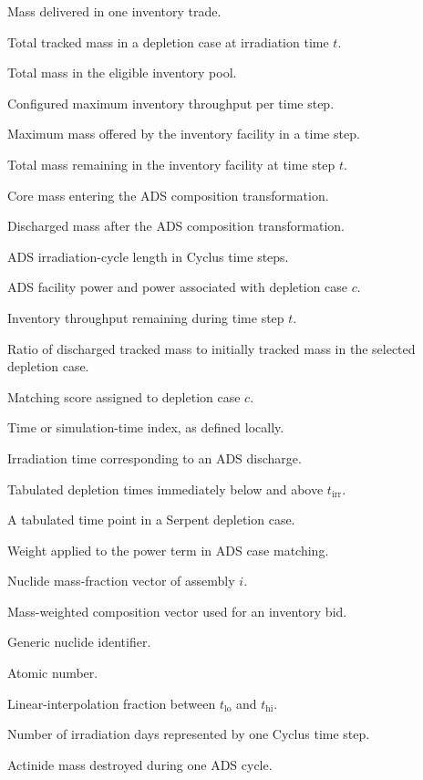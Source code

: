 \begin{symbollist}[1.55in]
\item[\(m_{\mathrm{supplied}}\)] Mass delivered in one inventory trade.
\item[\(M(t)\)] Total tracked mass in a depletion case at irradiation time \(t\).
\item[\(M_{\mathrm{eligible}}\)] Total mass in the eligible inventory pool.
\item[\(M_{\mathrm{throughput}}\)] Configured maximum inventory throughput per time step.
\item[\(M_{\mathrm{offer}}\)] Maximum mass offered by the inventory facility in a time step.
\item[\(M_{\mathrm{inv},t}\)] Total mass remaining in the inventory facility at time step \(t\).
\item[\(M_{\mathrm{in}}\)] Core mass entering the ADS composition transformation.
\item[\(M_{\mathrm{out}}\)] Discharged mass after the ADS composition transformation.
\item[\(n_{\mathrm{cycle}}\)] ADS irradiation-cycle length in Cyclus time steps.
\item[\(P, P_c\)] ADS facility power and power associated with depletion case \(c\).
\item[\(R_t\)] Inventory throughput remaining during time step \(t\).
\item[\(R\)] Ratio of discharged tracked mass to initially tracked mass in the selected depletion case.
\item[\(S_c\)] Matching score assigned to depletion case \(c\).
\item[\(t\)] Time or simulation-time index, as defined locally.
\item[\(t_{\mathrm{irr}}\)] Irradiation time corresponding to an ADS discharge.
\item[\(t_{\mathrm{lo}},t_{\mathrm{hi}}\)] Tabulated depletion times immediately below and above \(t_{\mathrm{irr}}\).
\item[\(t_k\)] A tabulated time point in a Serpent depletion case.
\item[\(w_P\)] Weight applied to the power term in ADS case matching.
\item[\(\mathbf{x}_i\)] Nuclide mass-fraction vector of assembly \(i\).
\item[\(\mathbf{x}_{\mathrm{bid}}\)] Mass-weighted composition vector used for an inventory bid.
\item[\(X\)] Generic nuclide identifier.
\item[\(Z\)] Atomic number.
\item[\(\alpha\)] Linear-interpolation fraction between \(t_{\mathrm{lo}}\) and \(t_{\mathrm{hi}}\).
\item[\(\Delta_d\)] Number of irradiation days represented by one Cyclus time step.
\item[\(\Delta M_{\mathrm{act}}\)] Actinide mass destroyed during one ADS cycle.

\end{symbollist}
